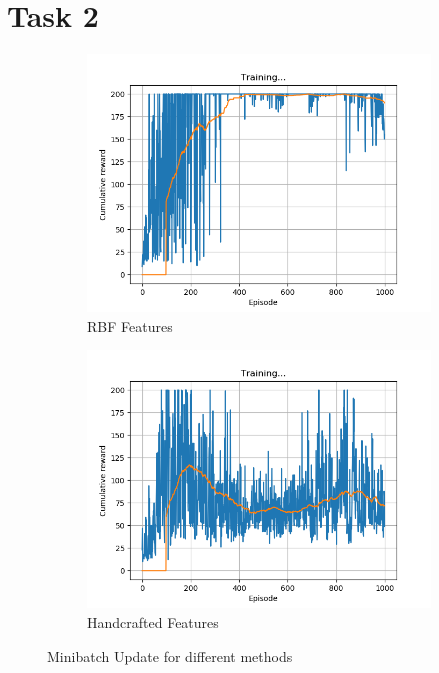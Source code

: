 \documentclass[a4paper]{article}
\begin{document}
\section*{Task 2}
\begin{figure}[h!]
    \centering
    \begin{subfigure}[b]{0.49\textwidth}
        \centering
        \includegraphics[width=\textwidth]{training_rbf_experience_replay.png}
        \caption{RBF Features}
        \label{fig-rbf-minibatch}
    \end{subfigure}
    \begin{subfigure}[b]{0.49\textwidth}
        \centering
        \includegraphics[width=\textwidth]{training_handcrafted_experience_replay.png}
        \caption{Handcrafted Features}
        \label{fig-handcrafted-minibatch}
    \end{subfigure}
    \caption{Minibatch Update for different methods}
    \label{fig-minibatch-update}
\end{figure}
\end{document}
